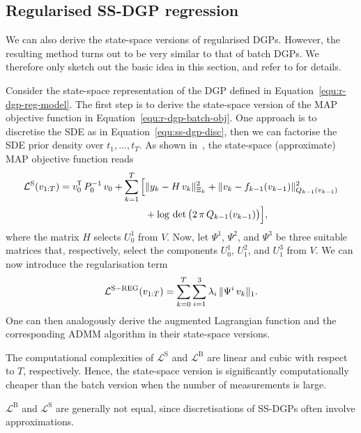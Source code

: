 \subsection*{Regularised SS-DGP regression}
We can also derive the state-space versions of regularised DGPs. However, the resulting method turns out to be very similar to that of batch DGPs. We therefore only sketch out the basic idea in this section, and refer to \citet{Zhao2021RSSGP} for details.

Consider the state-space representation of the DGP defined in Equation~\eqref{equ:r-dgp-reg-model}. The first step is to derive the state-space version of the MAP objective function in Equation~\eqref{equ:r-dgp-batch-obj}. One approach is to discretise the SDE as in Equation~\eqref{equ:ss-dgp-disc}, then we can factorise the SDE prior density over $t_1,\ldots, t_T$. As shown in~\citet{Zhao2021RSSGP}, the state-space (approximate) MAP objective function reads
%
\begin{equation}
	\begin{split}
		\mathcal{L}^\mathrm{S}(v_{1:T}) = v_0^{\mkern-1.5mu\mathsf{T}} \, P_0^{-1}\,v_0 + \sum^T_{k=1} \Big[ &\lVert y_k - H \, v_k\rVert^2_{\Xi_k} + \lVert v_k - f_{k-1}(v_{k-1})\rVert^2_{Q_{k-1}(v_{k-1})} \\
		&+ \log \, \det\big(2 \, \pi \, Q_{k-1}(v_{k-1})\big)\Big],
	\end{split}
\end{equation}
%
where the matrix $H$ selects $U^1_0$ from $V$. Now, let $\Psi^1$, $\Psi^2$, and $\Psi^3$ be three suitable matrices that, respectively, select the components $U^1_0$, $U^2_1$, and $U^3_1$ from $V$. We can now introduce the regularisation term
%
\begin{equation}
	\mathcal{L}^{\mathrm{S-REG}}(v_{1:T}) = \sum^T_{k=0} \sum^3_{i=1} \lambda_i \, \lVert\Psi^i \, v_k\rVert_1.
\end{equation}
%
One can then analogously derive the augmented Lagrangian function and the corresponding ADMM algorithm in their state-space versions.

\begin{remark}
	The computational complexities of $\mathcal{L}^\mathrm{S}$ and $\mathcal{L}^\mathrm{B}$ are linear and cubic with respect to $T$, respectively. Hence, the state-space version is significantly computationally cheaper than the batch version when the number of measurements is large. 
\end{remark}

\begin{remark}
	$\mathcal{L}^\mathrm{B}$ and $\mathcal{L}^\mathrm{S}$ are generally not equal, since discretisations of SS-DGPs often involve approximations.
\end{remark}

